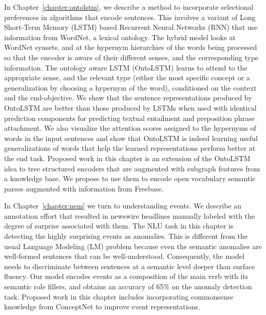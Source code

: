 In Chapter~\ref{chapter:ontolstm}, we describe a method to incorporate selectional 
preferences in algorithms that encode sentences. This involves a variant of Long Short-Term
Memory (LSTM) based Recurrent Neural Networks (RNN) that use information
from WordNet, a lexical 
ontology. The hybrid model looks at WordNet synsets, and at the hypernym hierarchies of the
words being processed so that the 
encoder is aware of their different senses, and the corresponding type information.
The ontology aware LSTM (OntoLSTM) learns to attend to the appropriate sense,
and the relevant type 
(either the most specific concept or a generalization by choosing a hypernym of
the word), conditioned on the context and the end-objective. We show that the sentence representations 
produced by OntoLSTM are better than those produced by LSTMs when used with identical prediction 
components for predicting textual entailment and preposition phrase attachment. We also visualize the attention scores assigned to the hypernyms 
of words in the input sentences and show that OntoLSTM is indeed learning useful generalizations of words
that help the learned representations perform better at the end task. Proposed work in this chapter is an extension
of the OntoLSTM idea to tree structured encoders that are augmented with subgraph features from a knowledge base. We propose 
to use them to encode open vocabulary semantic parses augmented with information from Freebase.

In Chapter~\ref{chapter:nem} we turn to understanding events.
We describe an annotation effort that resulted in newswire headlines manually labeled with the degree
of surprise associated with them. The NLU task in this chapter is detecting the highly
surprising events as anomalies. This is different from the usual Language Modeling (LM) problem
because even the semantic anomalies are well-formed sentences that can be well-understood. Consequently,
the model needs to discriminate between sentences at a semantic level deeper than surface fluency. Our model encodes events
as a composition of the main verb with its semantic role fillers, and obtains an accuracy of 65\% on the anomaly detection task.
Proposed work in this chapter includes incorporating commonsense knowledge from ConceptNet to improve event representations.

